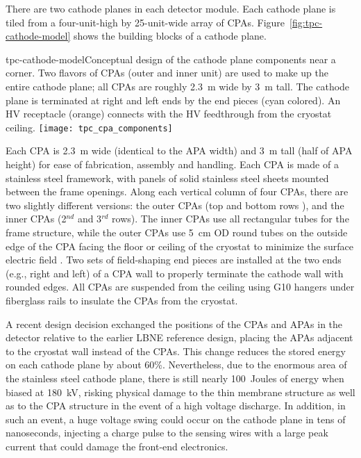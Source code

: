 There are two cathode planes in each detector module.  Each cathode plane is 
tiled from a four-unit-high by 25-unit-wide array of CPAs. Figure~\ref{fig:tpc-cathode-model} shows the
building blocks of a cathode plane.  
\begin{cdrfigure} 
{tpc-cathode-model}{Conceptual design of the cathode plane 
components near a corner.  Two flavors of CPAs (outer 
and inner unit) are used to make up the entire cathode plane; all
CPAs are roughly 2.3~m wide by 3~m tall. 
The cathode plane is terminated at
right and left ends by the end pieces (cyan colored).  An HV receptacle 
(orange) connects with the HV feedthrough from the cryostat ceiling. }
\texttt{[image: tpc\_cpa\_components]}
\end{cdrfigure}

Each CPA is 2.3~m wide (identical to the APA width) and 3~m tall (half
of APA height) for ease of fabrication, assembly and handling.  Each
CPA is made of a stainless steel framework, with panels of solid
stainless steel sheets mounted between the frame openings.  Along each
vertical column of four CPAs, there are two slightly different
versions: the outer CPAs (top and bottom rows ), and the inner CPAs
(2$^{nd}$ and 3$^{rd}$ rows).  The inner CPAs use all rectangular
tubes for the frame structure, while the outer CPAs use 5~cm OD round
tubes on the outside edge of the CPA facing the floor or ceiling of
the cryostat to minimize the surface electric field .  Two sets of field-shaping
end pieces are installed at the two ends (e.g., right and left) of a
CPA wall to properly terminate the cathode wall with rounded edges.
All CPAs are suspended from the ceiling using G10 hangers under
fiberglass rails to insulate the CPAs from the cryostat.

A recent design decision exchanged the positions of the CPAs and APAs
in the detector relative to the earlier LBNE reference design, placing
the APAs adjacent to the cryostat wall instead of the CPAs.  This
change reduces the stored energy on each cathode plane by about 60\%.
Nevertheless, due to the enormous area of the stainless steel cathode
plane, there is still nearly 100~Joules of energy when biased at
180~kV, risking physical damage to the thin membrane structure as well
as to the CPA structure in the event of a high voltage discharge.  In
addition, in such an event, a huge voltage swing could occur on the
cathode plane in tens of nanoseconds, injecting a charge pulse to the
sensing wires with a large peak current that could damage the
front-end electronics.

